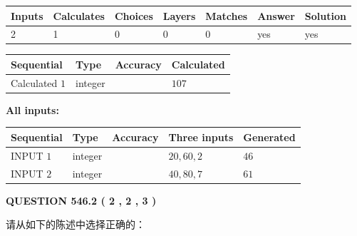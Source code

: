 \documentclass{ctexart}
\begin{document}
 
\noindent{}
 
 

 
   
   
   
   
\noindent\begin{tabular}{|l|l|l|l|l|l|l|}
 \hline
Inputs & Calculates & Choices & Layers & Matches & Answer & Solution \\ \hline
 2  & 
 1  & 
 0
  & 
 0  & 
 0  & 
  yes & 
  yes 
  \\ \hline
 \end{tabular}
   
   
   
   
\noindent{}
   
   
  
  
\noindent\begin{tabular}{|l|l|l|l|}
\hline
 Sequential & Type & Accuracy & Calculated \\ 
\hline
 
 
  Calculated $  1 $ & integer &  & 
  $ 107 $ 
 \\  \hline  
 \end{tabular}
   
   
   
   
\noindent\vspace{0.1in}\hspace{-0.08in} {\textbf{\Large{All inputs: }}}
   
   
  
  
\noindent\begin{tabular}{|l|l|l|l|l|}
\hline
 Sequential & Type & Accuracy & Three inputs & Generated \\ 
\hline
 
 
  INPUT $  1 $ & integer &  & $
 20
 , 
 60
 , 
 2
 $ & $ 46 $ 
 \\  \hline  
 
 
  INPUT $  2 $ & integer &  & $
 40
 , 
 80
 , 
 7
 $ & $ 61 $ 
 \\  \hline  
 \end{tabular}
   
   
  
\vspace{0.2in}
  
{\textbf{\Large{QUESTION
546.2 
 ( 2 , 2 , 3 )
}}}
  
  
请从如下的陈述中选择正确的：
 
\end{document}
